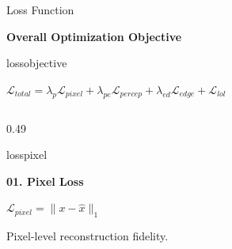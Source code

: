 \documentclass[
    11pt,%
    aspectratio=169,%
]{beamer}
\begin{document}

\begin{frame}{Loss Function}

\scriptsize


{\color{LossNavy}\bfseries Overall Optimization Objective}

\vspace{0.06cm}

\begin{beamercolorbox}[
    wd=0.88\textwidth,
    sep=0.08cm,
    rounded=true,
    center
]{lossobjective}

    $\displaystyle
    \mathcal{L}_{total}
    =
    \lambda_p\mathcal{L}_{pixel}
    +\lambda_{pe}\mathcal{L}_{percep}
    +\lambda_{ed}\mathcal{L}_{edge}
    +\mathcal{L}_{lol}
    $

\end{beamercolorbox}

\vspace{0.13cm}


\begin{columns}[T,onlytextwidth]


\begin{column}{0.49\textwidth}

\begin{beamercolorbox}[
    wd=\linewidth,
    sep=0.10cm,
    rounded=true
]{losspixel}

    {\color{LossNavy}\bfseries 01. Pixel Loss}

    \vspace{0.10cm}

    \centering
    $\displaystyle
    \mathcal{L}_{pixel}
    =
    \|x-\hat{x}\|_1
    $

    \vspace{0.08cm}

    \raggedright

    Pixel-level reconstruction fidelity.


\end{beamercolorbox}
\end{column}
\end{columns}
\end{frame}
\end{document}
